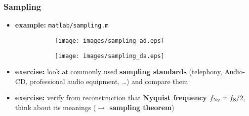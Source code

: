 \begin{frame}
	\frametitle{Sampling}
	\begin{itemize}
		\item \textbf{example: }\texttt{matlab/sampling.m}
			\begin{figure}
				\centering
				\begin{subfigure}[t]{0.48\linewidth}
					\texttt{[image: images/sampling\_ad.eps]}
				\end{subfigure}
				\hspace{0.01\linewidth}
				\begin{subfigure}[t]{0.48\linewidth}
					\texttt{[image: images/sampling\_da.eps]}
				\end{subfigure}
			\end{figure}
		\item \textbf{exercise:} look at commonly used \textbf{sampling standards} (telephony, Audio-CD, professional audio equipment, \ldots) and compare them
		\item \textbf{exercise:} verify from reconstruction that \textbf{Nyquist frequency} $f_{\textrm{Ny}}=f_{\textrm S}/2$, think about its meanings (\textbf{$\rightarrow$ sampling theorem})
	\end{itemize}
\end{frame}

